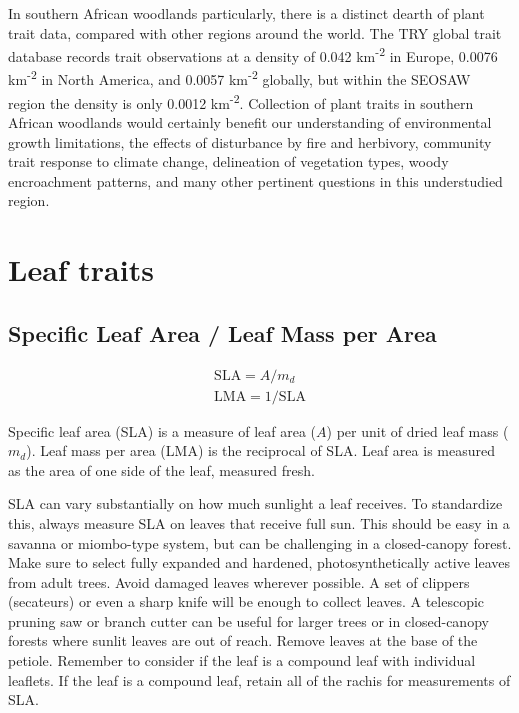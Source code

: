 \documentclass[11pt,a4paper]{article}
\begin{document}
In southern African woodlands particularly, there is a distinct dearth of plant trait data, compared with other regions around the world. The TRY global trait database \citep{TRY} records trait observations at a density of 0.042 km\textsuperscript{-2} in Europe, 0.0076 km\textsuperscript{-2} in North America, and 0.0057 km\textsuperscript{-2} globally, but within the SEOSAW region the density is only 0.0012 km\textsuperscript{-2}. Collection of plant traits in southern African woodlands would certainly benefit our understanding of environmental growth limitations, the effects of disturbance by fire and herbivory, community trait response to climate change, delineation of vegetation types, woody encroachment patterns, and many other pertinent questions in this understudied region.



\section{Leaf traits}

\subsection{Specific Leaf Area / Leaf Mass per Area}

\begin{equation}
	\begin{gathered}
		\text{SLA} = A / m_{d} \\
		\text{LMA} = 1 / \text{SLA}
	\end{gathered}
\end{equation}

Specific leaf area (SLA) is a measure of leaf area ($A$) per unit of dried leaf mass ($m_{d}$). Leaf mass per area (LMA) is the reciprocal of SLA. Leaf area is measured as the area of one side of the leaf, measured fresh. 

SLA can vary substantially on how much sunlight a leaf receives. To standardize this, always measure SLA on leaves that receive full sun. This should be easy in a savanna or miombo-type system, but can be challenging in a closed-canopy forest. Make sure to select fully expanded and hardened, photosynthetically active leaves from adult trees. Avoid damaged leaves wherever possible. A set of clippers (secateurs) or even a sharp knife will be enough to collect leaves. A telescopic pruning saw or branch cutter can be useful for larger trees or in closed-canopy forests where sunlit leaves are out of reach. Remove leaves at the base of the petiole. Remember to consider if the leaf is a compound leaf with individual leaflets. If the leaf is a compound leaf, retain all of the rachis for measurements of SLA.
\end{document}
